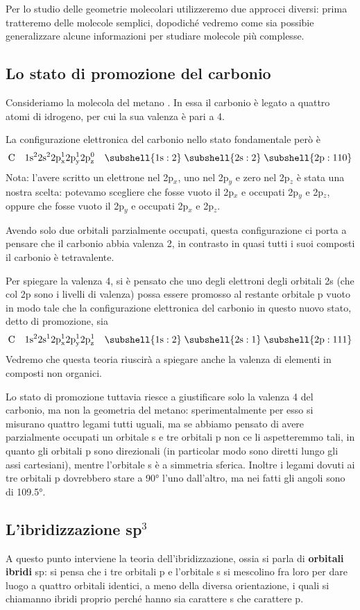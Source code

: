 Per lo studio delle geometrie molecolari utilizzeremo due approcci diversi: prima tratteremo delle molecole semplici, dopodiché vedremo come sia possibie generalizzare alcune informazioni per studiare molecole più complesse.
\subsection{Lo stato di promozione del carbonio}
Consideriamo la molecola del metano . In essa il carbonio è legato a quattro atomi di idrogeno, per cui la sua valenza è pari a 4.

La configurazione elettronica del carbonio nello stato fondamentale però è
$$\rm C \quad 1s^22s^22p_x^12p_y^12p_z^0 \quad \subshell{1s:2} \; \subshell{2s:2} \; \subshell{2p:110}$$
Nota: l'avere scritto  un elettrone nel 2p$_x$, uno nel 2p$_y$ e zero nel 2p$_z$ è stata una nostra scelta: potevamo scegliere che fosse vuoto il 2p$_x$ e occupati 2p$_y$ e 2p$_z$, oppure che fosse vuoto il 2p$_y$ e occupati 2p$_x$ e 2p$_z$.

Avendo solo due orbitali parzialmente occupati, questa configurazione ci porta a pensare che il carbonio abbia valenza 2, in contrasto in quasi tutti i suoi composti il carbonio è tetravalente.

Per spiegare la valenza 4, si è pensato che uno degli elettroni degli orbitali 2s (che col 2p sono i livelli di valenza) possa essere promosso al restante orbitale p vuoto in modo tale che la configurazione elettronica del carbonio in questo nuovo stato, detto di promozione, sia
$$\rm C \quad 1s^22s^12p_x^12p_y^12p_z^1 \quad \subshell{1s:2} \; \subshell{2s:1} \; \subshell{2p:111}$$
Vedremo che questa teoria riuscirà a spiegare anche la valenza di elementi in composti non organici.

Lo stato di promozione tuttavia riesce a giustificare solo la valenza 4 del carbonio, ma non la geometria del metano: sperimentalmente per esso si misurano quattro legami tutti uguali, ma se abbiamo pensato di avere parzialmente occupati un orbitale s e tre orbitali p non ce li aspetteremmo tali, in quanto gli orbitali p sono direzionali (in particolar modo sono diretti lungo gli assi cartesiani), mentre l'orbitale s è a simmetria sferica. Inoltre i legami dovuti ai tre orbitali p dovrebbero stare a 90° l'uno dall'altro, ma nei fatti gli angoli sono di 109.5°.
\subsection{L'ibridizzazione sp$^3$}
A questo punto interviene la teoria dell'ibridizzazione, ossia si parla di \textbf{orbitali ibridi} sp: si pensa che i tre orbitali p e l'orbitale s si mescolino fra loro per dare luogo a quattro orbitali identici, a meno della diversa orientazione, i quali si chiamanno ibridi proprio perché hanno sia carattere s che carattere p.

